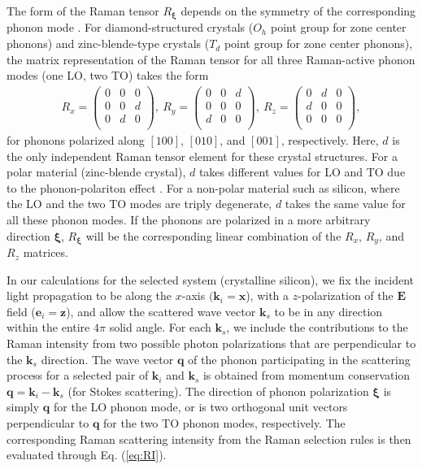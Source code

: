 \documentclass[%
 reprint,
superscriptaddress,
 amsmath,amssymb,
 aps,
pra,
]{revtex4-1}
\newcommand{\mb}[1]{\mathbf{#1}} %
\begin{document}
The form of the Raman tensor $R_{\boldsymbol{\xi}}$ depends on the symmetry of the corresponding phonon mode \cite{loudon1964raman}. For diamond-structured crystals ($O_h$ point group for zone center phonons) and zinc-blende-type crystals ($T_d$ point group for zone center phonons), the matrix representation of the Raman tensor for all three Raman-active phonon modes (one LO, two TO) takes the form
\begin{align}\label{eq:RT}
	R_x = \begin{pmatrix}
		0 & 0 & 0\\
		0 & 0 & d\\
		0 & d & 0\\
	\end{pmatrix},\ 
	R_y = \begin{pmatrix}
		0 & 0 & d\\
		0 & 0 & 0\\
		d & 0 & 0\\
	\end{pmatrix},\ 
	R_z = \begin{pmatrix}
		0 & d & 0\\
		d & 0 & 0\\
		0 & 0 & 0\\
	\end{pmatrix},
\end{align}
for phonons polarized along $[100]$, $[010]$, and $[001]$, respectively. Here, $d$ is the only independent Raman tensor element for these crystal structures. For a polar material (zinc-blende crystal), $d$ takes different values for LO and TO  due to the phonon-polariton effect \cite{yu1996fundamentals}. For a non-polar material such as silicon, where the LO and the two TO modes are triply degenerate, $d$ takes the same value for all these phonon modes. If the phonons are polarized in a more arbitrary direction $\boldsymbol{\xi}$, $R_{\boldsymbol{\xi}}$ will be the corresponding linear combination of the $R_x$, $R_y$, and $R_z$ matrices.





In our calculations for the selected system (crystalline silicon), we fix the incident light propagation to be along the $x$-axis $(\mb{k}_i=\mb{x}$), with a $z$-polarization of the $\mb{E}$ field ($\mb{e}_i=\mb{z}$), and allow the scattered wave vector $\mb{k}_s$ to be in any direction within the entire $4\pi$ solid angle. For each $\mb{k}_s$, we include the contributions to the Raman intensity from two possible photon polarizations that are perpendicular to the $\mb{k}_s$ direction. The wave vector $\mb{q}$ of the phonon participating in the scattering process for a selected pair of $\mb{k}_i$ and $\mb{k}_s$ is obtained from momentum conservation $\mb{q}=\mb{k}_i-\mb{k}_s$ (for Stokes scattering). The direction of phonon polarization $\boldsymbol{\xi}$ is simply $\mb{q}$ for  the LO phonon mode, or is two orthogonal unit vectors perpendicular to $\mb{q}$ for the two TO phonon modes, respectively. The corresponding Raman scattering intensity from the Raman selection rules is then evaluated through Eq. (\ref{eq:RI}).
\end{document}
